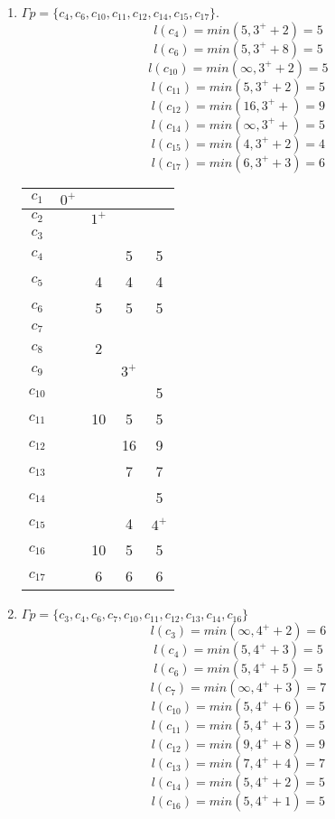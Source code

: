 \documentclass[12pt, a4paper] {ncc}
\begin{document}
\begin{enumerate}
    \item $\Gamma p = \{ c_4, c_6, c_{10}, c_{11}, c_{12}, c_{14}, c_{15}, c_{17}\}$.
        $$l(c_4)    = min(5, 3^+ + 2) = 5 $$
        $$l(c_6)    = min(5, 3^+ + 8) = 5 $$
        $$l(c_{10}) = min(\infty, 3^+ + 2) = 5 $$
        $$l(c_{11}) = min(5, 3^+ + 2) = 5 $$
        $$l(c_{12}) = min(16, 3^+ + ) = 9 $$
        $$l(c_{14}) = min(\infty, 3^+ + ) = 5 $$
        $$l(c_{15}) = min(4, 3^+ + 2) = 4 $$
        $$l(c_{17}) = min(6, 3^+ + 3) = 6 $$
\begin{tabular} {|c|c|c|c|c|}
    \hline
    $c_{1}$  &$0^+$&      &     &    \\ \hline
    $c_{2}$  & \z  &$1^+$ &     &    \\ \hline
    $c_{3}$  & \z  & \z   & \z  &\z   \\ \hline
    $c_{4}$  & \z  & \z   & 5   & 5    \\ \hline
    $c_{5}$  & \z  & 4    & 4   & 4   \\ \hline
    $c_{6}$  & \z  & 5    & 5   & 5  \\ \hline
    $c_{7}$  & \z  & \z   & \z  & \z   \\ \hline
    $c_{8}$  & \z  & 2    & \z  & \z   \\ \hline
    $c_{9}$  & \z  & \z   &$3^+$&     \\ \hline
    $c_{10}$ & \z  & \z   & \z  & 5   \\ \hline
    $c_{11}$ & \z  & 10   &  5  & 5   \\ \hline
    $c_{12}$ & \z  & \z   & 16  & 9   \\ \hline
    $c_{13}$ & \z  & \z   & 7   & 7   \\ \hline
    $c_{14}$ & \z  & \z   & \z  & 5   \\ \hline
    $c_{15}$ & \z  & \z   & 4   &$4^+$   \\ \hline
    $c_{16}$ & \z  & 10   & 5   & 5   \\ \hline
    $c_{17}$ & \z  & 6    & 6   & 6   \\ \hline 
\end{tabular}

    \item $\Gamma p = \{ c_3, c_4, c_6, c_7, c_{10}, c_{11}, c_{12}, c_{13}, c_{14}, c_{16}\}$
        $$l(c_3) = min(\infty, 4^+ + 2) = 6$$
        $$l(c_4) = min(5, 4^+ + 3) = 5$$
        $$l(c_6) = min(5, 4^+ + 5) = 5$$
        $$l(c_7) = min(\infty, 4^+ + 3) = 7$$
        $$l(c_{10}) = min(5, 4^+ + 6) = 5$$
        $$l(c_{11}) = min(5, 4^+ + 3) = 5$$
        $$l(c_{12}) = min(9, 4^+ + 8) = 9$$
        $$l(c_{13}) = min(7, 4^+ + 4) = 7$$
        $$l(c_{14}) = min(5, 4^+ + 2) = 5$$
        $$l(c_{16}) = min(5, 4^+ + 1) = 5$$


\end{enumerate}
\end{document}
